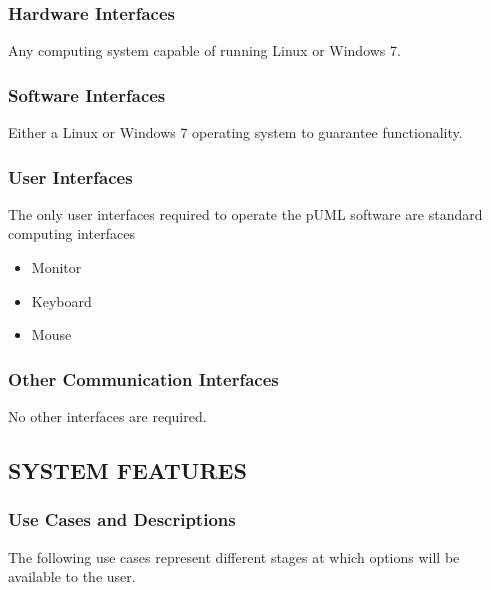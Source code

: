 \documentclass[twoside,letterpaper]{article}
\begin{document}
\subsubsection[Hardware Interfaces]{\bfseries
Hardware Interfaces}
{

{
Any computing system capable of running Linux or Windows 7.}}

\subsubsection[Software Interfaces]{\bfseries
Software Interfaces}
{ 
{
Either a Linux or Windows 7 operating system to guarantee functionality.
}}

\subsubsection[User Interfaces]{\bfseries
User Interfaces}
{
The only user interfaces required to operate the pUML software are standard computing interfaces
\begin{itemize}
  \item Monitor
  \item Keyboard
  \item Mouse
\end{itemize}
}

\subsubsection[Other Communication
Interfaces]{\bfseries
Other Communication Interfaces}
{
{No other interfaces are required. }}





\clearpage\setcounter{page}{1}\pagestyle{Convertv}

\subsection[SYSTEM FEATURES]{\bfseries
SYSTEM FEATURES}


\subsubsection{Use Cases and Descriptions}
{The following use cases represent different stages at which options will be available to the user.}

\bigskip
\bigskip

\end{document}
